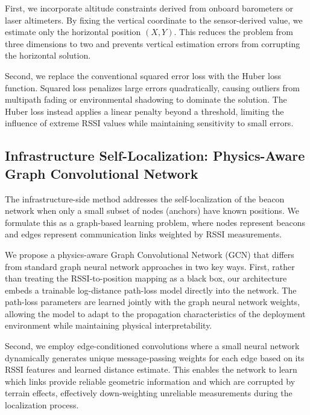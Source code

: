 \documentclass[master,final,11pt]{iscs-thesis}
\begin{document}
First, we incorporate altitude constraints derived from onboard barometers or laser altimeters.
By fixing the vertical coordinate to the sensor-derived value, we estimate only the horizontal position $(X, Y)$.
This reduces the problem from three dimensions to two and prevents vertical estimation errors from corrupting the horizontal solution.

Second, we replace the conventional squared error loss with the Huber loss function.
Squared loss penalizes large errors quadratically, causing outliers from multipath fading or environmental shadowing to dominate the solution.
The Huber loss instead applies a linear penalty beyond a threshold, limiting the influence of extreme RSSI values while maintaining sensitivity to small errors.

\subsection{Infrastructure Self-Localization: Physics-Aware Graph Convolutional Network}

The infrastructure-side method addresses the self-localization of the beacon network when only a small subset of nodes (anchors) have known positions.
We formulate this as a graph-based learning problem, where nodes represent beacons and edges represent communication links weighted by RSSI measurements.

We propose a physics-aware Graph Convolutional Network (GCN) that differs from standard graph neural network approaches in two key ways.
First, rather than treating the RSSI-to-position mapping as a black box, our architecture embeds a trainable log-distance path-loss model directly into the network.
The path-loss parameters are learned jointly with the graph neural network weights, allowing the model to adapt to the propagation characteristics of the deployment environment while maintaining physical interpretability.

Second, we employ edge-conditioned convolutions where a small neural network dynamically generates unique message-passing weights for each edge based on its RSSI features and learned distance estimate.
This enables the network to learn which links provide reliable geometric information and which are corrupted by terrain effects, effectively down-weighting unreliable measurements during the localization process.

\end{document}
